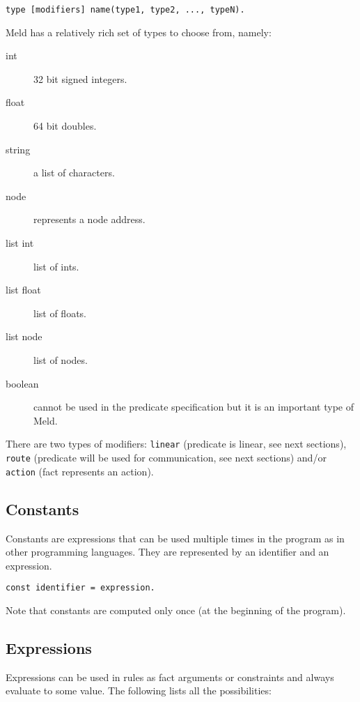 \documentclass[11pt]{article}
\begin{document}
\begin{verbatim}
type [modifiers] name(type1, type2, ..., typeN).
\end{verbatim}

Meld has a relatively rich set of types to choose from, namely:

\begin{description}
   \item[int] 32 bit signed integers.
   \item[float] 64 bit doubles.
   \item[string] a list of characters.
   \item[node] represents a node address.
   \item[list int] list of ints.
   \item[list float] list of floats.
   \item[list node] list of nodes.
   \item[boolean] cannot be used in the predicate specification but it is an important type of Meld.
\end{description}

There are two types of modifiers: \texttt{linear} (predicate is linear, see next sections), \texttt{route} (predicate will be used for communication, see next sections) and/or \texttt{action} (fact represents an action).

\subsection{Constants}

Constants are expressions that can be used multiple times in the program as in other programming languages.
They are represented by an identifier and an expression.

\begin{verbatim}
const identifier = expression.
\end{verbatim}

Note that constants are computed only once (at the beginning of the program).

\subsection{Expressions}

Expressions can be used in rules as fact arguments or constraints and always evaluate to some value. The following lists all the possibilities:
\end{document}
